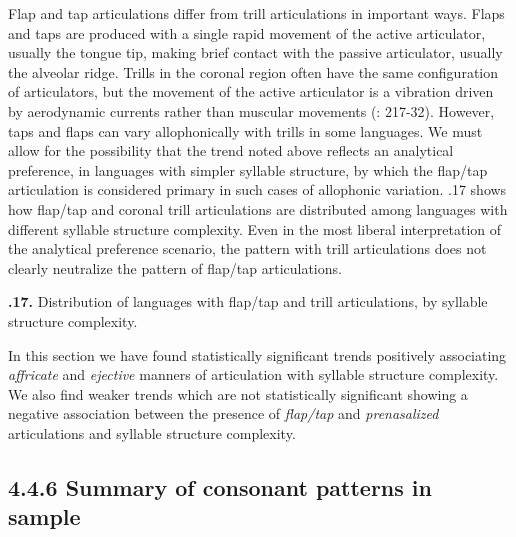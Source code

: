   Flap and tap articulations differ from trill articulations in important ways. Flaps and taps are produced with a single rapid movement of the active articulator, usually the tongue tip, making brief contact with the passive articulator, usually the alveolar ridge. Trills in the coronal region often have the same configuration of articulators, but the movement of the active articulator is a vibration driven by aerodynamic currents rather than muscular movements (\citealt{LadefogedMaddieson1996}: 217-32). However, taps and flaps can vary allophonically with trills in some languages. We must allow for the possibility that the trend noted above reflects an analytical preference, in languages with simpler syllable structure, by which the flap/tap articulation is considered primary in such cases of allophonic variation. .17 shows how flap/tap and coronal trill articulations are distributed among languages with different syllable structure complexity. Even in the most liberal interpretation of the analytical preference scenario, the pattern with trill articulations does not clearly neutralize the pattern of flap/tap articulations.





\textbf{.17.} Distribution of languages with flap/tap and trill articulations, by syllable structure complexity.



  In this section we have found statistically significant trends positively associating \textit{affricate} and \textit{ejective} manners of articulation with syllable structure complexity. We also find weaker trends which are not statistically significant showing a negative association between the presence of \textit{flap/tap} and \textit{prenasalized} articulations and syllable structure complexity.


\subsection{4.4.6 Summary of consonant patterns in sample}

